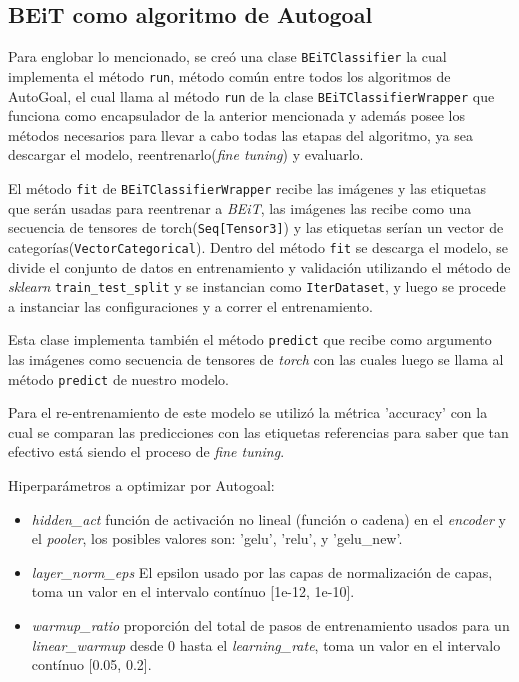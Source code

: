 \subsection{BEiT como algoritmo de Autogoal}
Para englobar lo mencionado, se creó una clase \texttt{BEiTClassifier} la cual implementa el método \texttt{run}, método común entre todos los algoritmos de AutoGoal, el cual llama al método \texttt{run} de la clase \texttt{BEiTClassifierWrapper} que funciona como encapsulador de la anterior mencionada y además posee los métodos necesarios para llevar a cabo todas las etapas del algoritmo, ya sea descargar el modelo, reentrenarlo(\textit{fine tuning}) y evaluarlo.

El método \texttt{fit} de \texttt{BEiTClassifierWrapper}  recibe las imágenes y las etiquetas que serán usadas para reentrenar a \textit{BEiT}, las imágenes las recibe como una secuencia de tensores de torch(\texttt{Seq[Tensor3]}) y las etiquetas serían un vector de categorías(\texttt{VectorCategorical}). Dentro del método \texttt{fit} se descarga el modelo, se divide el conjunto de datos en entrenamiento y validación utilizando el método de \textit{sklearn} \texttt{train\_test\_split} y se instancian como \texttt{IterDataset}, y luego se procede a instanciar las configuraciones y a correr el entrenamiento.

Esta clase implementa también el método \texttt{predict} que recibe como argumento las imágenes como secuencia de tensores de \textit{torch} con las cuales luego se llama al método \texttt{predict} de nuestro modelo.

Para el re-entrenamiento de este modelo se utilizó la métrica 'accuracy' con la cual se comparan las predicciones con las etiquetas referencias para saber que tan efectivo está siendo el proceso de \textit{fine tuning}.

Hiperparámetros a optimizar por Autogoal:
\begin{itemize}
    \item \textit{hidden\_act} función de activación no lineal (función o cadena) en el \textit{encoder} y el \textit{pooler}, los posibles valores son: 'gelu', 'relu', y 'gelu\_new'.
    \item \textit{layer\_norm\_eps} El epsilon usado por las capas de normalización de capas, toma un valor en el intervalo contínuo [1e-12, 1e-10].
    \item \textit{warmup\_ratio} proporción del total de pasos de entrenamiento usados para un \textit{linear\_warmup} desde 0 hasta el \textit{learning\_rate}, toma un valor en el intervalo contínuo [0.05, 0.2].
\end{itemize}

